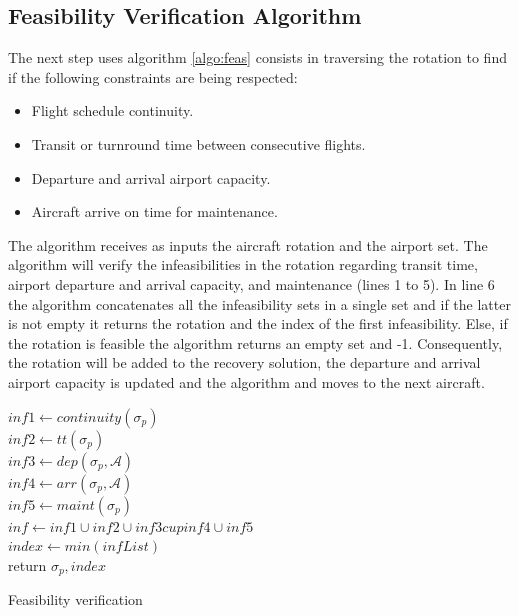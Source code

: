 \subsection{Feasibility Verification Algorithm} \label{sec:feasVer}
The next step uses algorithm \ref{algo:feas} consists in traversing the rotation to find  if the following constraints are being respected:\\

\begin{itemize}
	\item Flight schedule continuity.\\
	\item Transit or turnround time between consecutive flights.\\
	\item Departure and arrival airport capacity.\\
	\item Aircraft arrive on time for maintenance.\\
\end{itemize}

The algorithm receives as inputs the aircraft rotation and the airport set. The algorithm will  verify the infeasibilities in the rotation regarding transit time, airport departure and arrival capacity, and maintenance (lines 1 to 5). In line 6 the algorithm concatenates all the infeasibility sets in a single set and if the latter is not empty it returns the rotation and the index of the first infeasibility. Else, if the rotation is feasible the algorithm returns an empty set and -1. Consequently, the rotation will be added to the recovery solution, the departure and arrival airport capacity is updated and the algorithm and moves to the next aircraft.



	\begin{algorithm}[H]
		\DontPrintSemicolon
		$inf1 \gets continuity(\sigma_p)$\\		%
		$inf2 \gets tt(\sigma_p)$\\ 		%
		$inf3 \gets dep(\sigma_p, \mathcal{A})$\\%
		$inf4 \gets arr(\sigma_p, \mathcal{A})$\\%
		$inf5 \gets maint(\sigma_p)$\\ %
		$inf \gets inf1 \cup inf2 \cup inf3 cup inf4 \cup inf5$\\
		{
			$index \gets min(infList)$\\
			return $\sigma_p, index$\\
		}
		\caption{Feasibility verification}
		\label{algo:feas}
	\end{algorithm}

